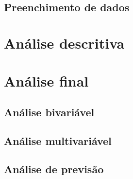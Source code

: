 \documentclass[10pt, conference, compsocconf]{IEEEtran}
\begin{document}
\lipsum[2]


\subsection{Preenchimento de dados}

\lipsum[2]


\section{Análise descritiva}
\label{sec:ads}

\lipsum[1]

\lipsum[2]


\section{Análise final}
\label{sec:afn}

\lipsum[5]


\subsection{Análise bivariável}

\lipsum[2]


\subsection{Análise multivariável}

\lipsum[3]


\subsection{Análise de previsão}

\lipsum[4]

\end{document}
